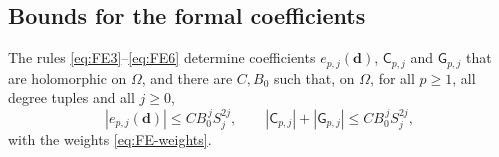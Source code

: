 \subsection{Bounds for the formal coefficients}\label{app:coefficient-bounds}

\begin{lemma}\label{lem:coefficient-bounds}
The rules \eqref{eq:FE3}--\eqref{eq:FE6} determine coefficients
$e_{p,j}(\mathbf d)$, $\mathsf C_{p,j}$ and $\mathsf G_{p,j}$ that are
holomorphic on $\Omega$, and there are $C,B_0$ such that, on $\Omega$, for
all $p\ge1$, all degree tuples and all $j\ge0$,
\[
 |e_{p,j}(\mathbf d)|\le CB_0^{\,j}S_j^{2j},\qquad
 |\mathsf C_{p,j}|+|\mathsf G_{p,j}|\le CB_0^{\,j}S_j^{2j},
\]
with the weights \eqref{eq:FE-weights}.
\end{lemma}

